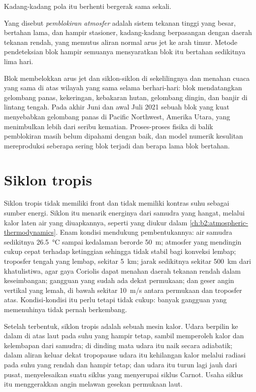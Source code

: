 Kadang-kadang pola itu berhenti bergerak sama sekali.

\begin{definition}\label{def:b2:weather-systems:blocking}
Yang disebut \emph{pemblokiran atmosfer} adalah sistem tekanan tinggi yang besar, bertahan lama, dan hampir
stasioner, kadang-kadang berpasangan dengan daerah tekanan rendah, yang memutus aliran normal arus jet ke arah
timur. Metode pendeteksian blok hampir semuanya mensyaratkan blok itu bertahan sedikitnya lima
hari.
\end{definition}

Blok membelokkan arus jet dan siklon-siklon di sekelilingnya dan menahan cuaca yang sama di atas wilayah
yang sama selama berhari-hari: blok mendatangkan gelombang panas, kekeringan, kebakaran hutan, gelombang dingin, dan banjir di
lintang tengah. Pada akhir Juni dan awal Juli 2021 sebuah blok yang kuat menyebabkan gelombang panas di
Pacific Northwest, Amerika Utara, yang menimbulkan lebih dari seribu kematian. Proses-proses
fisika di balik pemblokiran masih belum dipahami dengan baik, dan model numerik kesulitan
mereproduksi seberapa sering blok terjadi dan berapa lama blok bertahan.

\section{Siklon tropis}\label{sec:b2:weather-systems:tropical}

Siklon tropis tidak memiliki front dan tidak memiliki kontras suhu sebagai sumber energi. Siklon itu menarik energinya
dari samudra yang hangat, melalui kalor laten air yang diuapkannya, seperti yang diukur dalam \cref{ch:b2:atmospheric-thermodynamics}.
Enam kondisi mendukung pembentukannya: air samudra sedikitnya \qty{26.5}{\celsius}
sampai kedalaman berorde \qty{50}{m}; atmosfer yang mendingin cukup cepat terhadap ketinggian sehingga
tidak stabil bagi konveksi lembap; troposfer tengah yang lembap, sekitar \qty{5}{km}; jarak
sedikitnya sekitar \qty{500}{km} dari khatulistiwa, agar gaya Coriolis dapat menahan daerah tekanan rendah dalam
keseimbangan; gangguan yang sudah ada dekat permukaan; dan geser angin vertikal yang lemah, di bawah sekitar
\qty{10}{m/s} antara permukaan dan troposfer atas. Kondisi-kondisi itu perlu tetapi tidak
cukup: banyak gangguan yang memenuhinya tidak pernah berkembang.

Setelah terbentuk, siklon tropis adalah sebuah mesin kalor. Udara berpilin ke dalam di atas laut pada suhu yang hampir
tetap, sambil memperoleh kalor dan kelembapan dari samudra; di dinding mata udara itu naik
secara adiabatik; dalam aliran keluar dekat tropopause udara itu kehilangan kalor melalui radiasi pada suhu yang rendah
dan hampir tetap; dan udara itu turun lagi jauh dari pusat, menyelesaikan suatu siklus yang
menyerupai siklus Carnot. Usaha siklus itu menggerakkan angin melawan gesekan permukaan
laut.


